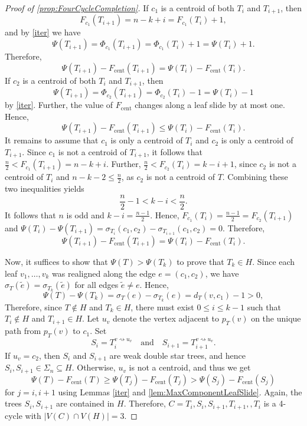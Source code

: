 \documentclass[reqno,dvipsnames]{amsart}
\theoremstyle{plain}
\numberwithin{equation}{section}
\theoremstyle{definition}
\begin{document}
\begin{proof} [Proof of \autoref{prop:FourCycleCompletion}]
			If $c_1$ is a centroid of both $T_i$ and $T_{i+1}$, then 
			\[
				F_{c_1} (T_{i+1}) = n - k + i = F_{c_1} (T_i) + 1,
			\]
			and by \autoref{iter} we have
			\[
				\Psi(T_{i+1}) = \Phi_{c_1}(T_{i+1}) = \Phi_{c_1} (T_i) + 1 = \Psi(T_i) + 1.
			\]
			Therefore, 
			\[
				\Psi(T_{i+1}) - F_\mathrm{cent} (T_{i+1}) = \Psi(T_i) - F_\mathrm{cent} (T_i).
			\]
			If $c_2$ is a centroid of both $T_i$ and $T_{i+1}$, then 
			\[
				\Psi(T_{i+1}) = \Phi_{c_2}(T_{i+1}) = \Phi_{c_2} (T_i) - 1 = \Psi(T_i) - 1
			\]
			by \autoref{iter}. Further, the value of $F_\mathrm{cent}$ changes along a leaf slide by at most one. Hence, 
			\[
				\Psi(T_{i+1}) - F_\mathrm{cent} (T_{i+1}) \leq \Psi(T_i) - F_\mathrm{cent} (T_i).
			\]
			It remains to assume that $c_1$ is only a centroid of $T_i$ and $c_2$ is only a centroid of $T_{i+1}$. Since $c_1$ is not a centroid of $T_{i+1}$, it follows that $\frac{n}{2} < F_{c_1}(T_{i+1}) = n-k+i$. Further, $\frac{n}{2} < F_{c_2}(T_i) = k-i+1$, since $c_2$ is not a centroid of $T_i$ and $n-k-2 \leq \frac{n}{2}$, as $c_2$ is not a centroid of $T$. Combining these two inequalities yields
			\[
				\frac{n}{2} - 1 < k-i < \frac{n}{2}.
			\]
			It follows that $n$ is odd and $k-i = \frac{n-1}{2}$. Hence, $F_{c_1}(T_i) = \frac{n-1}{2} = F_{c_2}(T_{i+1})$ and $\Psi(T_i)-\Psi(T_{i+1}) = \sigma_{T_i}(c_1,c_2) - \sigma_{T_{i+1}}(c_1,c_2) = 0$. Therefore,
			\[
				\Psi(T_{i+1}) - F_\mathrm{cent} (T_{i+1}) = \Psi(T_i) - F_\mathrm{cent} (T_i).
			\]

			Now, it suffices to show that $\Psi(T) > \Psi(T_k)$ to prove that $T_k\in H$. Since each leaf $v_1,\ldots,v_k$ was realigned along the edge $e = (c_1, c_2)$, we have $\sigma_T (\tilde{e}) = \sigma_{T_k} (\tilde{e})$ for all edges $\tilde{e}\neq e$. Hence,
			\[
				\Psi(T) - \Psi(T_k) = \sigma_T (e) - \sigma_{T_k} (e) = d_T(v,c_1) - 1 > 0,
			\]
			Therefore, since $T\notin H$ and $T_k\in H$, there must exist $0\leq i \leq k-1$ such that $T_i\notin H$ and $T_{i+1}\in H$. Let $u_v$ denote the vertex adjacent to $p_T(v)$ on the unique path from $p_T(v)$ to $c_1$. Set
			\[
				S_i = T_i^{v\rightsquigarrow u_v} \quad \text{and} \quad S_{i+1} = T_{i+1}^{v\rightsquigarrow u_v}.
			\]
			If $u_v = c_2$, then $S_i$ and $S_{i+1}$ are weak double star trees, and hence $S_i, S_{i+1} \in \Sigma_n \subseteq H$. Otherwise, $u_v$ is not a centroid, and thus we get 
			\[
				\Psi(T) - F_\mathrm{cent} (T) \geq \Psi(T_j) - F_\mathrm{cent} (T_j) > \Psi(S_j) - F_\mathrm{cent} (S_j)
			\] 
			for $j = i, i+1$ using Lemmas \ref{iter} and \ref{lem:MaxComponentLeafSlide}. Again, the trees $S_i, S_{i+1}$ are contained in $H$. Therefore, $C = T_i, S_i, S_{i+1}, T_{i+1},, T_i$ is a 4-cycle with $|V(C) \cap V(H)| = 3$.
		\end{proof}
\end{document}
